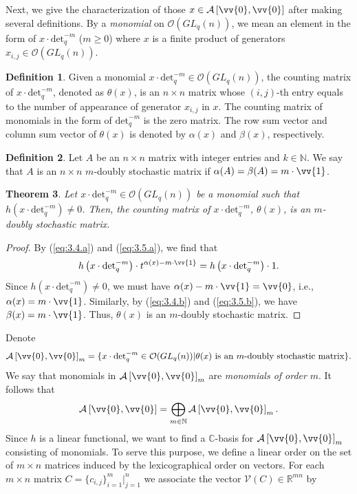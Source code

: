\documentclass[table,a4paper,reqno]{amsart}
\numberwithin{equation}{section}
\newtheorem{theorem}{Theorem}[section]
\theoremstyle{definition}
\newtheorem{definition}[theorem]{Definition}
\begin{document}
Next, we give the characterization of those $x\in\mathcal{A}\left[\vv{0},\vv{0}\right]$ after making several definitions. By a \textit{monomial} on $\mathcal{O}(GL_q(n))$, we mean an element in the form of $x\cdot\text{det}_q^{-m}$ ($m\ge 0$) where $x$ is a finite product of generators $x_{i,j}\in \mathcal{O}(GL_q(n))$.
\begin{definition}\label{def:3.1}
    Given a monomial $x\cdot\text{det}_q^{-m}\in \mathcal{O}(GL_q(n))$, the counting matrix of $x\cdot\text{det}_q^{-m}$, denoted as $\theta(x)$, is an $n\times n$ matrix whose $(i,j)$-th entry equals to the number of appearance of generator $x_{i,j}$ in $x$. The counting matrix of monomials in the form of $\text{det}_q^{-m}$ is the zero matrix. The row sum vector and column sum vector of $\theta(x)$ is denoted by $\alpha(x)$ and $\beta(x)$, respectively.
\end{definition}
\begin{definition}\label{def:3.4}
    Let $A$ be an $n\times n$ matrix with integer entries and $k\in\mathbb{N}$. We say that $A$ is an $n\times n$ $m$-doubly stochastic matrix if $\alpha(A)=\beta(A)=m\cdot\vv{1}$.
\end{definition}
\begin{theorem}\label{thm:3.4}
    Let $x\cdot\text{det}_q^{-m}\in \mathcal{O}(GL_q(n))$ be a monomial such that $h\left(x\cdot\text{det}_q^{-m}\right)\ne 0$. Then, the counting matrix of $x\cdot\text{det}_q^{-m}$, $\theta(x)$, is an $m$-doubly stochastic matrix.
\end{theorem}
\begin{proof}
    By (\ref{eq:3.4.a}) and (\ref{eq:3.5.a}), we find that 
    $$h\left(x\cdot\text{det}_q^{-m}\right)\cdot t^{\alpha(x)-m\cdot\vv{1}}=h\left(x\cdot\text{det}_q^{-m}\right)\cdot 1.$$
    Since $h\left(x\cdot\text{det}_q^{-m}\right)\ne 0$, we must have $\alpha(x)-m\cdot\vv{1}=\vv{0}$, i.e., $\alpha(x)=m\cdot\vv{1}$. Similarly, by (\ref{eq:3.4.b}) and (\ref{eq:3.5.b}), we have $\beta(x)=m\cdot\vv{1}$. Thus, $\theta(x)$ is an $m$-doubly stochastic matrix.
\end{proof}
\noindent Denote 
$$\mathcal{A}\left[\vv{0},\vv{0}\right]_m=\{x\cdot\text{det}_q^{-m}\in\mathcal{O}(GL_q(n))| \theta(x)\text{ is an }m\text{-doubly stochastic matrix}\}.$$
We say that monomials in $\mathcal{A}\left[\vv{0},\vv{0}\right]_m$ are \textit{monomials of order} $m$. It follows that
$$\mathcal{A}\left[\vv{0},\vv{0}\right]=\bigoplus_{m\in\mathbb{N}}\mathcal{A}\left[\vv{0},\vv{0}\right]_m.$$
Since $h$ is a linear functional, we want to find a $\mathbb{C}$-basis for $\mathcal{A}\left[\vv{0},\vv{0}\right]_m$ consisting of monomials. To serve this purpose, we define a linear order on the set of $m\times n$ matrices induced by the lexicographical order on vectors. For each $m\times n$ matrix $C=\{c_{i,j}\}_{i=1}^m|_{j=1}^n$ we associate the vector $\mathcal{V}(C)\in\mathbb{R}^{mn}$ by
\end{document}
